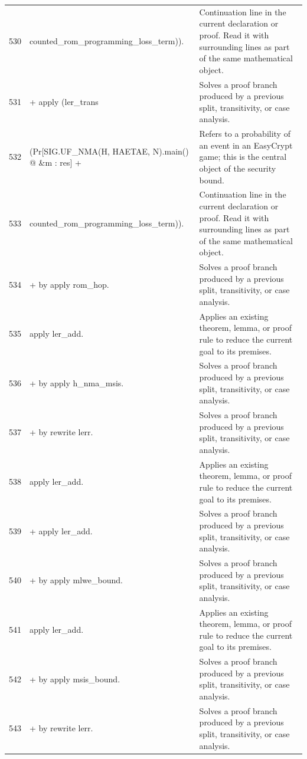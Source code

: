 \documentclass[10pt]{article}
\begin{document}
\begin{longtable}{r L{0.53\textwidth} L{0.37\textwidth}}
530 & {\ttfamily\scriptsize     counted\_rom\_programming\_loss\_term)).} & Continuation line in the current declaration or proof.  Read it with surrounding lines as part of the same mathematical object. \\
531 & {\ttfamily\scriptsize + apply (ler\_trans} & Solves a proof branch produced by a previous split, transitivity, or case analysis. \\
532 & {\ttfamily\scriptsize     (Pr[SIG.UF\_NMA(H, HAETAE, N).main() @ \&m : res] +} & Refers to a probability of an event in an EasyCrypt game; this is the central object of the security bound. \\
533 & {\ttfamily\scriptsize       counted\_rom\_programming\_loss\_term)).} & Continuation line in the current declaration or proof.  Read it with surrounding lines as part of the same mathematical object. \\
534 & {\ttfamily\scriptsize   + by apply rom\_hop.} & Solves a proof branch produced by a previous split, transitivity, or case analysis. \\
535 & {\ttfamily\scriptsize   apply ler\_add.} & Applies an existing theorem, lemma, or proof rule to reduce the current goal to its premises. \\
536 & {\ttfamily\scriptsize   + by apply h\_nma\_msis.} & Solves a proof branch produced by a previous split, transitivity, or case analysis. \\
537 & {\ttfamily\scriptsize   + by rewrite lerr.} & Solves a proof branch produced by a previous split, transitivity, or case analysis. \\
538 & {\ttfamily\scriptsize apply ler\_add.} & Applies an existing theorem, lemma, or proof rule to reduce the current goal to its premises. \\
539 & {\ttfamily\scriptsize + apply ler\_add.} & Solves a proof branch produced by a previous split, transitivity, or case analysis. \\
540 & {\ttfamily\scriptsize   + by apply mlwe\_bound.} & Solves a proof branch produced by a previous split, transitivity, or case analysis. \\
541 & {\ttfamily\scriptsize   apply ler\_add.} & Applies an existing theorem, lemma, or proof rule to reduce the current goal to its premises. \\
542 & {\ttfamily\scriptsize   + by apply msis\_bound.} & Solves a proof branch produced by a previous split, transitivity, or case analysis. \\
543 & {\ttfamily\scriptsize   + by rewrite lerr.} & Solves a proof branch produced by a previous split, transitivity, or case analysis. \\

\end{longtable}
\end{document}
